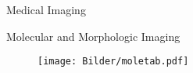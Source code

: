 \begin{frame}[c]{Medical Imaging}
\end{frame}




\begin{frame}[c]{Molecular and Morphologic Imaging}
	\begin{figure}
		\texttt{[image: Bilder/moletab.pdf]}
	\end{figure}
\end{frame}






